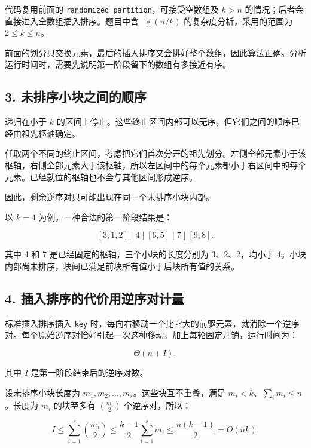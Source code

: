 \documentclass[
  UTF8,fontset=none,zihao=5]{ctexart}
\let\OldSubsection\subsection
\renewcommand{\subsection}{\Needspace{4\baselineskip}\OldSubsection}
\begin{document}
代码复用前面的 \texttt{randomized\_partition}，可接受空数组及 \(k>n\)
的情况；后者会直接进入全数组插入排序。题目中含 \(\lg(n/k)\)
的复杂度分析，采用的范围为 \(2\le k\le n\)。

前面的划分只交换元素，最后的插入排序又会排好整个数组，因此算法正确。分析运行时间时，需要先说明第一阶段留下的数组有多接近有序。

\hypertarget{ux672aux6392ux5e8fux5c0fux5757ux4e4bux95f4ux7684ux987aux5e8f}{%
\subsection{3.
未排序小块之间的顺序}\label{ux672aux6392ux5e8fux5c0fux5757ux4e4bux95f4ux7684ux987aux5e8f}}

递归在小于 \(k\)
的区间上停止。这些终止区间内部可以无序，但它们之间的顺序已经由祖先枢轴确定。

任取两个不同的终止区间，考虑把它们首次分开的祖先划分。左侧全部元素小于该枢轴，右侧全部元素大于该枢轴，所以左区间中的每个元素都小于右区间中的每个元素。已经就位的枢轴也不会与其他区间形成逆序。

因此，剩余逆序对只可能出现在同一个未排序小块内部。

以 \(k=4\) 为例，一种合法的第一阶段结果是：

\[
[3,1,2]\;|\;4\;|\;[6,5]\;|\;7\;|\;[9,8].
\]

其中 4 和 7 是已经固定的枢轴，三个小块的长度分别为 3、2、2，均小于
4。小块内部尚未排序，块间已满足前块所有值小于后块所有值的关系。

\hypertarget{ux63d2ux5165ux6392ux5e8fux7684ux4ee3ux4ef7ux7528ux9006ux5e8fux5bf9ux8ba1ux91cf}{%
\subsection{4.
插入排序的代价用逆序对计量}\label{ux63d2ux5165ux6392ux5e8fux7684ux4ee3ux4ef7ux7528ux9006ux5e8fux5bf9ux8ba1ux91cf}}

标准插入排序插入 \texttt{key}
时，每向右移动一个比它大的前驱元素，就消除一个逆序对。每个原始逆序对恰好引起一次这种移动，加上每轮固定开销，运行时间为：

\[
\Theta(n+I),
\]

其中 \(I\) 是第一阶段结束后的逆序对数。

设未排序小块长度为 \(m_1,m_2,\ldots,m_s\)。这些块互不重叠，满足
\(m_i<k\)、\(\sum_i m_i\le n\)。长度为 \(m_i\) 的块至多有
\(\binom{m_i}{2}\) 个逆序对，所以：

\[
I\le\sum_{i=1}^{s}\binom{m_i}{2}
\le\frac{k-1}{2}\sum_{i=1}^{s}m_i
\le\frac{n(k-1)}2
=O(nk).
\]
\end{document}
